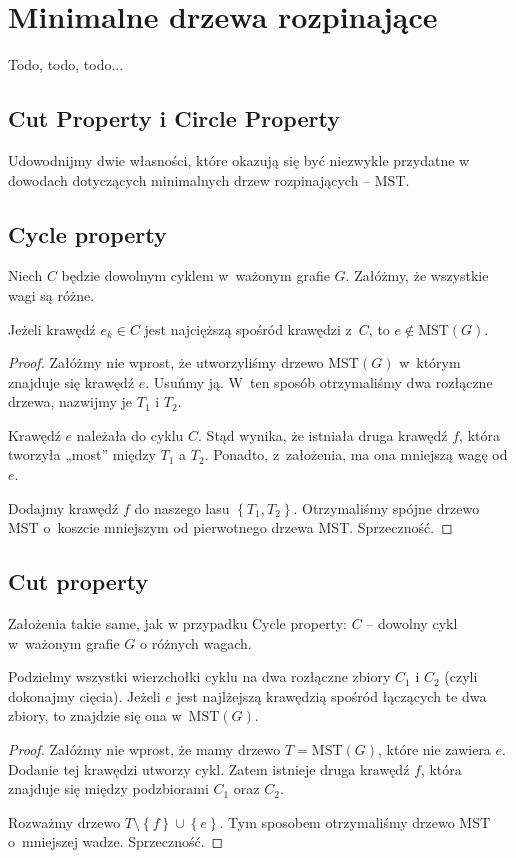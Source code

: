 \section{Minimalne drzewa rozpinające}

Todo, todo, todo...

\subsection{Cut Property i Circle Property}

Udowodnijmy dwie własności, które okazują się być niezwykle przydatne w dowodach dotyczących minimalnych drzew rozpinających – MST.

\subsection{Cycle property}
    Niech $C$ będzie dowolnym cyklem w~ważonym grafie $G$. Załóżmy, że wszystkie wagi są różne.
\begin{theorem}
   Jeżeli krawędź $e_k \in C$ jest najcięższą spośród krawędzi z~$C$, to $e \notin \text{MST}\left( G \right)$.
\end{theorem}
\begin{proof}
    Załóżmy nie wprost, że utworzyliśmy drzewo $\text{MST}\left( G \right)$ w~którym znajduje się krawędź $e$. Usuńmy ją. W~ten sposób otrzymaliśmy dwa rozłączne drzewa, nazwijmy je $T_1$ i $T_2$.
    
    Krawędź $e$ należała do cyklu $C$. Stąd wynika, że istniała druga krawędź $f$, która tworzyła „most” między $T_1$ a $T_2$. Ponadto, z~założenia, ma ona mniejszą wagę od $e$. 
    
    Dodajmy krawędź $f$ do naszego lasu $ \left\{ T_{1},T_{2}\right\} $. Otrzymaliśmy spójne drzewo MST o~koszcie mniejszym od pierwotnego drzewa MST. Sprzeczność.
\end{proof}

\subsection{Cut property}
    Założenia takie same, jak w przypadku Cycle property: $C$ – dowolny cykl w~ważonym grafie $G$ o różnych wagach.
\begin{theorem}
   Podzielmy wszystki wierzchołki cyklu na dwa rozłączne zbiory $C_1$ i $C_2$ (czyli dokonajmy cięcia). Jeżeli $e$ jest najlżejszą krawędzią spośród łączących te dwa zbiory, to znajdzie się ona w~$\text{MST}\left( G \right) $.
\end{theorem}
\begin{proof}
    Załóżmy nie wprost, że mamy drzewo $T = \text{MST}\left( G \right) $, które nie zawiera $ e $. Dodanie tej krawędzi utworzy cykl. Zatem istnieje druga krawędź $ f $, która znajduje się między podzbiorami $ C_{1} $ oraz $ C_{2} $.
    
    Rozważmy drzewo $ T \setminus \left\{ f \right\} \cup \left\{ e \right\} $. Tym sposobem otrzymaliśmy drzewo MST o~mniejszej wadze. Sprzeczność.
\end{proof}

